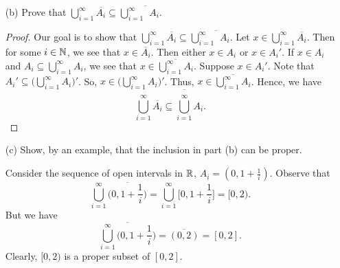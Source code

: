 \documentclass[a4paper]{article}
\begin{document}
\begin{enumerate}
\begin{enumerate}
\begin{proof}
\begin{align*}
                                                                   &= \Big( \bigcup_{ i= 1}^{ n }  {A}_{i} \Big) \cup \Big(  \bigcup_{ i=1  }^{ n }  {A}_{i}' \Big) \\
                                                                   &= \bigcup_{ i=1  }^{ n }  {A}_{i} \cup {A}_{i}' \\
                &= \bigcup_{ i=1  }^{ n }  \overline{{A}_{i}}.
                    \end{align*}
                    \end{proof}
                \item[(b)] Prove that \( \bigcup_{ i=1 }^{ \infty  }  \overline{{A}_{i}} \subseteq  \overline{\bigcup_{ i=1 }^{ \infty  } } {A}_{i} \).
                    \begin{proof}
                    Our goal is to show that \( \bigcup_{ i=1 }^{ \infty  }  \overline{{A}_{i}} \subseteq  \overline{\bigcup_{ i=1 }^{ \infty  } } {A}_{i} \). Let \( x \in \bigcup_{ i=1  }^{ \infty  }  \overline{{A}_{i}} \). Then for some \( i \in \mathbb{N}  \), we see that \( x \in \overline{{A}_{i}} \). Then either \( x \in {A}_{i} \) or \( x \in {A}_{i}' \). If \( x \in {A}_{i} \) and \( {A}_{i} \subseteq \bigcup_{ i=1  }^{ \infty  } {A}_{i} \), we see that \( x \in \overline{\bigcup_{ i=1 }^{ \infty  } {A}_{i}} \). Suppose \( x \in {A}_{i}' \). Note that \( {A}_{i}' \subseteq \Big(  \bigcup_{ i=1  }^{ \infty  } {A}_{i} \Big)' \). So, \( x \in \Big(  \bigcup_{ i=1  }^{ \infty  } {A}_{i} \Big)' \). Thus, \( x \in \overline{\bigcup_{ i=1  }^{ \infty  } {A}_{i}} \). Hence, we have 
                    \[   \bigcup_{ i=1 }^{ \infty  }  \overline{{A}_{i}} \subseteq  \overline{\bigcup_{ i=1 }^{ \infty  } } {A}_{i}.  \]
                    \end{proof}
                \item[(c)] Show, by an example, that the inclusion in part (b) can be proper.
                    \begin{solution}
                    Consider the sequence of open intervals in \( \mathbb{R}  \), \( {A}_{i} = (  0 , 1 + \frac{ 1 }{ i }) \). Observe that  
                    \[  \bigcup_{ i=1  }^{ \infty  } \overline{\Big(0, 1 + \frac{ 1 }{ i }  \Big)} = \bigcup_{ i=1  }^{ \infty  }  \Big[ 0, 1 + \frac{ 1 }{ i } \Big] = [0,2).   \]
                    But we have
                    \[  \overline{\bigcup_{ i=1  }^{ \infty  }\Big( 0, 1 + \frac{ 1 }{ i }  \Big)} = \overline{(0,2)} = [0,2]. \]
                    Clearly, \( [0,2) \) is a proper subset of \( [0,2] \).
                    \end{solution}

\end{enumerate}
\end{enumerate}
\end{document}
